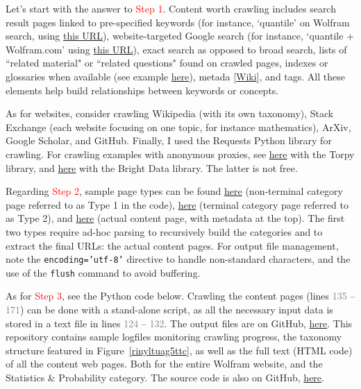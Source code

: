 \documentclass[oneside,10pt]{book}
\begin{document}
\noindent 
Let's start with the answer to \textcolor{red}{Step 1}. Content worth crawling includes search result pages linked to pre-specified keywords (for instance, `quantile' on Wolfram search,
 using \href{https://mathworld.wolfram.com/search/?query=quantile}{this URL}), website-targeted Google search  
(for instance, `quantile + Wolfram.com' using \href{https://www.google.com/search?q=quantile+\%2B+Wolfram.com}{this URL}), exact search as opposed to broad
 search,
lists of ``related material" or ``related questions" found on crawled pages,
 indexes or glossaries when available (see example \href{https://mathworld.wolfram.com/letters/}{here}), 
 \textcolor{index}{metada}  [\href{https://en.wikipedia.org/wiki/Meta_element}{Wiki}], and tags. All these elements help build 
 relationships between keywords or concepts. 

As for websites, consider crawling Wikipedia (with its own taxonomy), Stack Exchange (each website focusing on one topic, for instance mathematics), ArXiv, Google Scholar, and GitHub. Finally, I used the \textcolor{index}{Requests} Python library for crawling. 
For crawling examples with anonymous proxies, see 
\href{https://github.com/VincentGranville/Large-Language-Models/blob/main/tor_crawling.py}{here} with the 
\textcolor{index}{Torpy} library, and 
\href{https://github.com/VincentGranville/Large-Language-Models/blob/main/brightdata.py}{here} 
with the Bright Data library. The latter is not free.

Regarding \textcolor{red}{Step 2}, sample page types can be found 
\href{https://github.com/VincentGranville/Large-Language-Models/blob/main/sample-crawled-page-type-1.txt}{here} 
(non-terminal category page referred to as Type 1 in the code), 
\href{https://github.com/VincentGranville/Large-Language-Models/blob/main/sample-crawled-page-type-2.txt}{here} (terminal category page referred to as Type 2), and
\href{https://github.com/VincentGranville/Large-Language-Models/blob/main/sample-crawled-page-type-3.txt}{here}
 (actual content page, with metadata at the top). The first two types require ad-hoc parsing to recursively build the categories and to extract the final URLs:  the actual content pages. For output file management, note the \texttt{encoding='utf-8'} directive to handle non-standard characters, 
and the use of the \texttt{flush} command to avoid buffering.

As for \textcolor{red}{Step 3}, see the Python code below. Crawling the content pages (lines \textcolor{gray}{135} -- \textcolor{gray}{171}) can be done with a stand-alone script, as all the necessary input data is stored in a text file in lines
 \textcolor{gray}{124} -- \textcolor{gray}{132}. The output files are on GitHub, \href{https://github.com/VincentGranville/Large-Language-Models}{here}. This repository contains sample logfiles monitoring crawling  progress, the taxonomy structure featured
 in Figure~\ref{rinyltuag5ttc}, as well as the full text (HTML code) of all the content web pages. Both for the entire Wolfram website, and
 the Statistics \& Probability category.
The source code is also on GitHub, \href{https://github.com/VincentGranville/Large-Language-Models/blob/main/crawl_directory.py}{here}.
\end{document}
